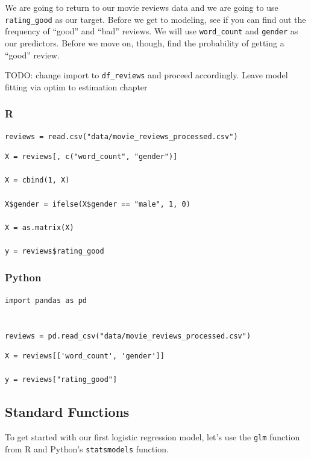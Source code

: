 \documentclass[
  letterpaper,
]{krantz}
\begin{document}
We are going to return to our movie reviews data and we are going to use
\texttt{rating\_good} as our target. Before we get to modeling, see if
you can find out the frequency of ``good'' and ``bad'' reviews. We will
use \texttt{word\_count} and \texttt{gender} as our predictors. Before
we move on, though, find the probability of getting a ``good'' review.

TODO: change import to \texttt{df\_reviews} and proceed accordingly.
Leave model fitting via optim to estimation chapter

\subsubsection{R}

\begin{verbatim}
reviews = read.csv("data/movie_reviews_processed.csv")
\end{verbatim}

\begin{verbatim}
X = reviews[, c("word_count", "gender")]

X = cbind(1, X)

X$gender = ifelse(X$gender == "male", 1, 0)

X = as.matrix(X)

y = reviews$rating_good
\end{verbatim}

\subsubsection{Python}

\begin{verbatim}
import pandas as pd


reviews = pd.read_csv("data/movie_reviews_processed.csv")
\end{verbatim}

\begin{verbatim}
X = reviews[['word_count', 'gender']]

y = reviews["rating_good"]
\end{verbatim}

\subsection{Standard Functions}\label{sec-glm-binomial-standard}

To get started with our first logistic regression model, let's use the
\texttt{glm} function from R and Python's \texttt{statsmodels} function.
\end{document}
